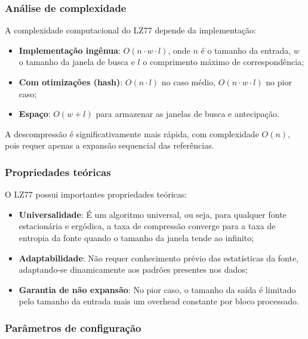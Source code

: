 \subsubsection{Análise de complexidade}

A complexidade computacional do LZ77 depende da implementação:

\begin{itemize}
    \item \textbf{Implementação ingênua}: $O(n \cdot w \cdot l)$, onde $n$ é o tamanho da entrada, $w$ o tamanho da janela de busca e $l$ o comprimento máximo de correspondência;
    
    \item \textbf{Com otimizações (hash)}: $O(n \cdot l)$ no caso médio, $O(n \cdot w \cdot l)$ no pior caso;
    
    \item \textbf{Espaço}: $O(w + l)$ para armazenar as janelas de busca e antecipação.
\end{itemize}

A descompressão é significativamente mais rápida, com complexidade $O(n)$, pois requer apenas a expansão sequencial das referências.

\subsubsection{Propriedades teóricas}

O LZ77 possui importantes propriedades teóricas:

\begin{itemize}
    \item \textbf{Universalidade}: É um algoritmo universal, ou seja, para qualquer fonte estacionária e ergódica, a taxa de compressão converge para a taxa de entropia da fonte quando o tamanho da janela tende ao infinito;
    
    \item \textbf{Adaptabilidade}: Não requer conhecimento prévio das estatísticas da fonte, adaptando-se dinamicamente aos padrões presentes nos dados;
    
    \item \textbf{Garantia de não expansão}: No pior caso, o tamanho da saída é limitado pelo tamanho da entrada mais um overhead constante por bloco processado.
\end{itemize}

\subsubsection{Parâmetros de configuração}

